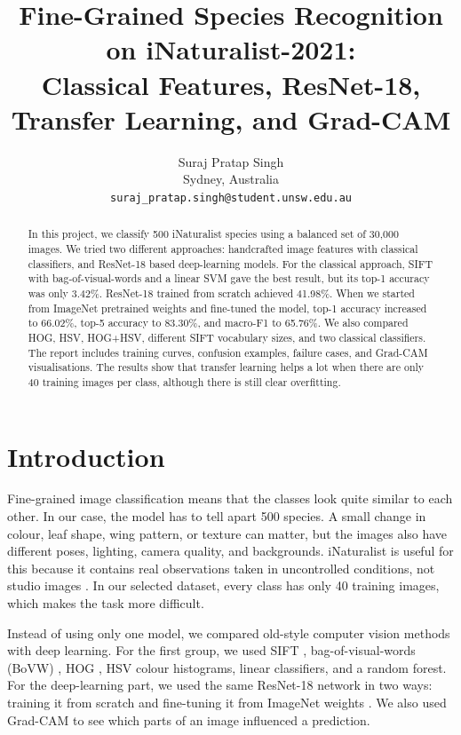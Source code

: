 \documentclass[10pt,twocolumn,letterpaper]{article}
\title{Fine-Grained Species Recognition on iNaturalist-2021:\\
Classical Features, ResNet-18, Transfer Learning, and Grad-CAM}
\author{Suraj Pratap Singh\\
Sydney, Australia\\
{\tt\small suraj\_pratap.singh@student.unsw.edu.au}}
\begin{document}
\maketitle

\begin{abstract}
In this project, we classify 500 iNaturalist species using a balanced set of 30,000 images.  We tried two different approaches: handcrafted image features with classical classifiers, and ResNet-18 based deep-learning models.  For the classical approach, SIFT with bag-of-visual-words and a linear SVM gave the best result, but its top-1 accuracy was only 3.42\%.  ResNet-18 trained from scratch achieved 41.98\%.  When we started from ImageNet pretrained weights and fine-tuned the model, top-1 accuracy increased to 66.02\%, top-5 accuracy to 83.30\%, and macro-F1 to 65.76\%.  We also compared HOG, HSV, HOG+HSV, different SIFT vocabulary sizes, and two classical classifiers.  The report includes training curves, confusion examples, failure cases, and Grad-CAM visualisations.  The results show that transfer learning helps a lot when there are only 40 training images per class, although there is still clear overfitting.
\end{abstract}

\section{Introduction}
Fine-grained image classification means that the classes look quite similar to each other.  In our case, the model has to tell apart 500 species.  A small change in colour, leaf shape, wing pattern, or texture can matter, but the images also have different poses, lighting, camera quality, and backgrounds.  iNaturalist is useful for this because it contains real observations taken in uncontrolled conditions, not studio images \cite{vanhorn2021benchmarking}.  In our selected dataset, every class has only 40 training images, which makes the task more difficult.

Instead of using only one model, we compared old-style computer vision methods with deep learning.  For the first group, we used SIFT \cite{lowe2004distinctive}, bag-of-visual-words (BoVW) \cite{csurka2004visual}, HOG \cite{dalal2005histograms}, HSV colour histograms, linear classifiers, and a random forest.  For the deep-learning part, we used the same ResNet-18 network \cite{he2016deep} in two ways: training it from scratch and fine-tuning it from ImageNet weights \cite{deng2009imagenet}.  We also used Grad-CAM \cite{selvaraju2017grad} to see which parts of an image influenced a prediction.
\end{document}
